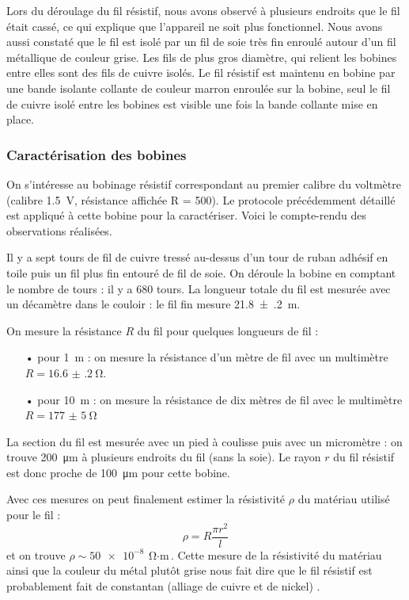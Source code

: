\documentclass[12pt,a4paper,fleqn]{article}
\begin{document}
Lors du déroulage du fil résistif, nous avons observé à plusieurs endroits que le fil était cassé, ce qui explique que l'appareil ne soit plus fonctionnel.
Nous avons aussi constaté que le fil est isolé par un fil de soie très fin enroulé autour d'un fil métallique de couleur grise.
Les fils de plus gros diamètre, qui relient les bobines entre elles sont des fils de cuivre isolés.
Le fil résistif est maintenu en bobine par une bande isolante collante de couleur marron enroulée sur la bobine, seul le fil de cuivre isolé entre les bobines est visible une fois la bande collante mise en place.

\subsubsection{Caractérisation des bobines}

On s'intéresse au bobinage résistif correspondant au premier calibre du voltmètre (calibre \SI{1.5}{V}, résistance affichée \og R = 500\fg{}).
Le protocole précédemment détaillé est appliqué à cette bobine pour la caractériser.
Voici le compte-rendu des observations réalisées.

Il y a sept tours de fil de cuivre tressé au-dessus d'un tour de ruban adhésif en toile puis un fil plus fin entouré de fil de soie.
On déroule la bobine en comptant le nombre de tours : il y a 680 tours.
La longueur totale du fil est mesurée avec un décamètre dans le couloir : le fil fin mesure \SI{21.8(2)}{m}.

On mesure la résistance $R$ du fil pour quelques longueurs de fil :
\begin{itemize}
\item[•] pour \SI{1}{m} : on mesure la résistance d'un mètre de fil avec un multimètre $ R = \SI{16.6(2)}{\ohm}$.
\item[•] pour \SI{10}{m} : on mesure la résistance de dix mètres de fil avec le multimètre $ R = \SI{177(5)}{\ohm} $
\end{itemize}

La section du fil est mesurée avec un pied à coulisse puis avec un micromètre : on trouve \SI{200}{\micro\metre} à plusieurs endroits du fil (sans la soie).
Le rayon $r$ du fil résistif est donc proche de \SI{100}{\um} pour cette bobine.

Avec ces mesures on peut finalement estimer la résistivité $\rho$ du matériau utilisé pour le fil :
\[
\rho = R \frac{\pi r^2}{l}
\]
et on trouve $\rho \sim \SI{50e-8}{\ohm\cdot\meter}$.
Cette mesure de la résistivité du matériau ainsi que la couleur du métal plutôt grise nous fait dire que le fil résistif est probablement fait de constantan (alliage de cuivre et de nickel) \cite{res_fil}.
\end{document}
